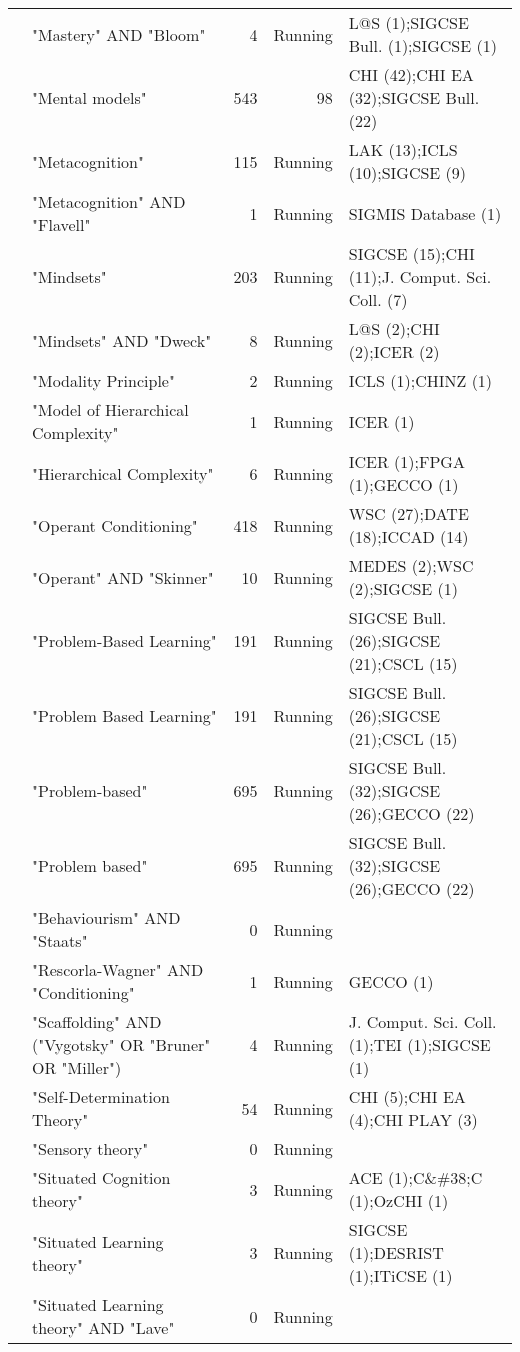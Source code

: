 \begin{table*}[t]
\begin{tabular}{lp{7cm}rrp{3cm}}
& "Mastery" AND "Bloom" & 4 & Running & L@S  (1);SIGCSE Bull. (1);SIGCSE  (1) \\
& "Mental models" & 543 & 98 & CHI  (42);CHI EA  (32);SIGCSE Bull. (22) \\
& "Metacognition" & 115 & Running & LAK  (13);ICLS  (10);SIGCSE  (9) \\
& "Metacognition" AND "Flavell" & 1 & Running & SIGMIS Database (1) \\
& "Mindsets" & 203 & Running & SIGCSE  (15);CHI  (11);J. Comput. Sci. Coll. (7) \\
& "Mindsets" AND "Dweck" & 8 & Running & L@S  (2);CHI  (2);ICER  (2) \\
& "Modality Principle" & 2 & Running & ICLS (1);CHINZ  (1) \\
& "Model of Hierarchical Complexity" & 1 & Running & ICER  (1) \\
& "Hierarchical Complexity" & 6 & Running & ICER  (1);FPGA  (1);GECCO  (1) \\
& "Operant Conditioning" & 418 & Running & WSC  (27);DATE  (18);ICCAD  (14) \\
& "Operant" AND "Skinner" & 10 & Running & MEDES  (2);WSC  (2);SIGCSE  (1) \\
& "Problem-Based Learning" & 191 & Running & SIGCSE Bull. (26);SIGCSE  (21);CSCL  (15) \\
& "Problem Based Learning" & 191 & Running & SIGCSE Bull. (26);SIGCSE  (21);CSCL  (15) \\
& "Problem-based" & 695 & Running & SIGCSE Bull. (32);SIGCSE  (26);GECCO  (22) \\
& "Problem based" & 695 & Running & SIGCSE Bull. (32);SIGCSE  (26);GECCO  (22) \\
& "Behaviourism" AND "Staats" & 0 & Running &  \\
& "Rescorla-Wagner" AND "Conditioning" & 1 & Running & GECCO  (1) \\
& "Scaffolding" AND ("Vygotsky" OR "Bruner" OR "Miller") & 4 & Running & J. Comput. Sci. Coll. (1);TEI  (1);SIGCSE  (1) \\
& "Self-Determination Theory" & 54 & Running & CHI  (5);CHI EA  (4);CHI PLAY  (3) \\
& "Sensory theory" & 0 & Running &  \\
& "Situated Cognition theory" & 3 & Running & ACE  (1);C\&\#38;C  (1);OzCHI  (1) \\
& "Situated Learning theory" & 3 & Running & SIGCSE  (1);DESRIST  (1);ITiCSE  (1) \\
& "Situated Learning theory" AND "Lave" & 0 & Running &  \\

\end{tabular}
\end{table*}

